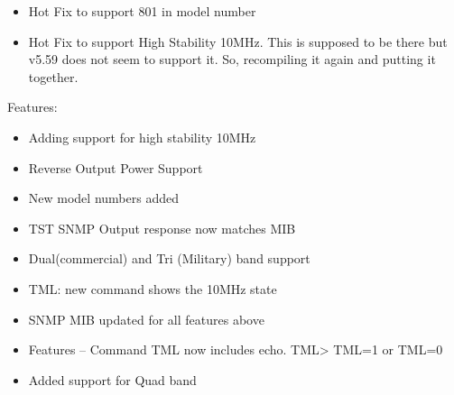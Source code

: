\documentclass[letterpaper,10pt,english]{sphinxhowto}
\begin{document}
\begin{description}
\begin{itemize}
\item {} 
\sphinxAtStartPar
Hot Fix to support 801 in model number

\end{itemize}

\begin{itemize}
\item {} 
\sphinxAtStartPar
Hot Fix to support High Stability 10MHz. This is supposed to be there but v5.59 does not seem to support it. So, recompiling it again and putting it together.

\end{itemize}

\sphinxAtStartPar
Features:
\begin{itemize}
\item {} 
\sphinxAtStartPar
Adding support for high stability 10MHz

\item {} 
\sphinxAtStartPar
Reverse Output Power Support

\item {} 
\sphinxAtStartPar
New model numbers added

\item {} 
\sphinxAtStartPar
TST SNMP Output response now matches MIB

\item {} 
\sphinxAtStartPar
Dual(commercial) and Tri (Military) band support

\item {} 
\sphinxAtStartPar
TML: new command shows the 10MHz state

\item {} 
\sphinxAtStartPar
SNMP MIB updated for all features above

\end{itemize}

\begin{itemize}
\item {} 
\sphinxAtStartPar
Features – Command TML now includes echo. TML\sphinxhyphen{}> TML=1 or TML=0

\end{itemize}

\begin{itemize}
\item {} 
\sphinxAtStartPar
Added support for Quad band

\end{itemize}


\end{description}
\end{document}
